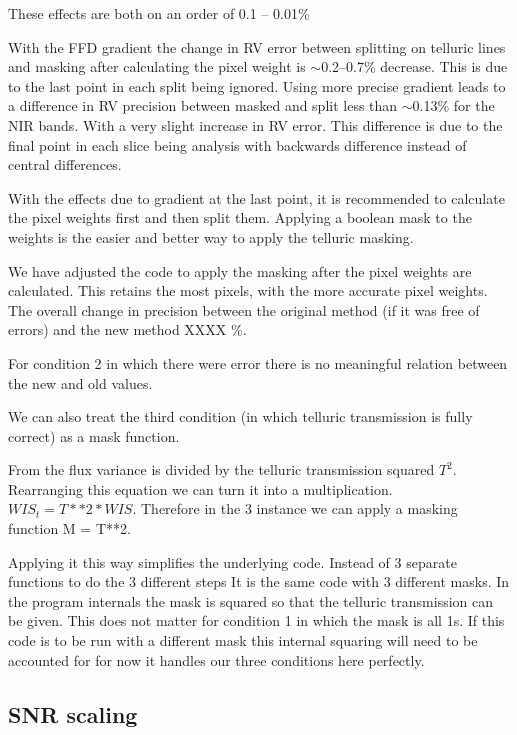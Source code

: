 These effects are both on an order of 0.1 -- 0.01\%



{
    With the FFD gradient the change in RV error between splitting on telluric lines and masking after calculating the pixel weight is \(\sim\)0.2--0.7\% decrease. This is due to the last point in each split being ignored.
    Using more precise gradient leads to a difference in RV precision between masked and split  less than \(\sim\)0.13\% for the NIR bands. With a very slight increase in RV error. This difference is due to the final point in each slice being analysis with backwards difference instead of central differences.

    With the effects due to gradient at the last point, it is recommended to calculate the pixel weights first and then split them. Applying a boolean mask to the weights is the easier and better way to apply the telluric masking.
}

We have adjusted the code to apply the masking after the pixel weights are calculated. This retains the most pixels, with the more accurate pixel weights. The overall change in precision between the original method (if it was free of errors) and the new method XXXX \%.

For condition 2 in which there were error there is no meaningful relation between the new and old values.

We can also treat the third condition (in which telluric transmission is fully correct) as a mask function.

From  the flux variance is divided by the telluric transmission squared \(T^2\). Rearranging this equation we can turn it into a multiplication. \(WIS_t = T**2 *WIS\). Therefore in the 3 instance we can apply a masking function M = T**2.

Applying it this way simplifies the underlying code. Instead of 3 separate functions to do the 3 different steps It is the same code with 3 different masks. In the program internals the mask is squared so that the telluric transmission can be given. This does not matter for condition 1 in which the mask is all 1s.
If this code is to be run with a different mask  this internal squaring will need to be accounted for for now it handles our three conditions here perfectly.






\subsection{SNR scaling}

